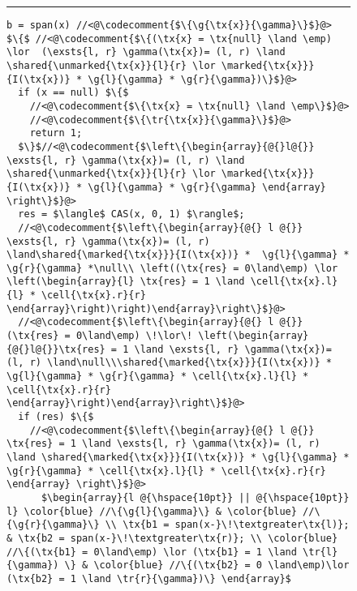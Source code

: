 \begin{figure}
\hrule    
\begin{lstlisting}
b = span(x) //<@\codecomment{$\{\g{\tx{x}}{\gamma}\}$}@>
$\{$ //<@\codecomment{$\{(\tx{x} = \tx{null} \land \emp) \lor  (\exsts{l, r} \gamma(\tx{x})= (l, r) \land \shared{\unmarked{\tx{x}}{l}{r} \lor \marked{\tx{x}}}{I(\tx{x})} * \g{l}{\gamma} * \g{r}{\gamma})\}$}@>
  if (x == null) $\{$
    //<@\codecomment{$\{\tx{x} = \tx{null} \land \emp\}$}@>
    //<@\codecomment{$\{\tr{\tx{x}}{\gamma}\}$}@>
    return 1;
  $\}$//<@\codecomment{$\left\{\begin{array}{@{}l@{}} \exsts{l, r} \gamma(\tx{x})= (l, r) \land \shared{\unmarked{\tx{x}}{l}{r} \lor \marked{\tx{x}}}{I(\tx{x})} * \g{l}{\gamma} * \g{r}{\gamma} \end{array} \right\}$}@>
  res = $\langle$ CAS(x, 0, 1) $\rangle$;
  //<@\codecomment{$\left\{\begin{array}{@{} l @{}} \exsts{l, r} \gamma(\tx{x})= (l, r) \land\shared{\marked{\tx{x}}}{I(\tx{x})} *  \g{l}{\gamma} * \g{r}{\gamma} *\null\\ \left((\tx{res} = 0\land\emp) \lor  \left(\begin{array}{l} \tx{res} = 1 \land \cell{\tx{x}.l}{l} * \cell{\tx{x}.r}{r} \end{array}\right)\right)\end{array}\right\}$}@>
  //<@\codecomment{$\left\{\begin{array}{@{} l @{}} (\tx{res} = 0\land\emp) \!\lor\! \left(\begin{array}{@{}l@{}}\tx{res} = 1 \land \exsts{l, r} \gamma(\tx{x})= (l, r) \land\null\\\shared{\marked{\tx{x}}}{I(\tx{x})} *  \g{l}{\gamma} * \g{r}{\gamma} * \cell{\tx{x}.l}{l} * \cell{\tx{x}.r}{r} \end{array}\right)\end{array}\right\}$}@>
  if (res) $\{$ 
    //<@\codecomment{$\left\{\begin{array}{@{} l @{}} \tx{res} = 1 \land \exsts{l, r} \gamma(\tx{x})= (l, r) \land \shared{\marked{\tx{x}}}{I(\tx{x})} * \g{l}{\gamma} * \g{r}{\gamma} * \cell{\tx{x}.l}{l} * \cell{\tx{x}.r}{r}    \end{array} \right\}$}@>
      $\begin{array}{l @{\hspace{10pt}} || @{\hspace{10pt}} l} \color{blue} //\{\g{l}{\gamma}\} & \color{blue} //\{\g{r}{\gamma}\} \\ \tx{b1 = span(x-}\!\textgreater\tx{l)}; & \tx{b2 = span(x-}\!\textgreater\tx{r)}; \\ \color{blue} //\{(\tx{b1} = 0\land\emp) \lor (\tx{b1} = 1 \land \tr{l}{\gamma}) \} & \color{blue} //\{(\tx{b2} = 0 \land\emp)\lor (\tx{b2} = 1 \land \tr{r}{\gamma})\} \end{array}$

\end{lstlisting}
\end{figure}
